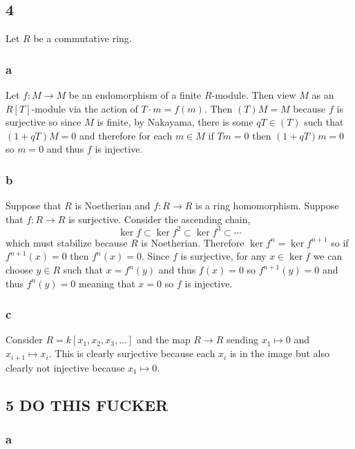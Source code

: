 \documentclass[12pt]{article}
\begin{document}
\subsection{4}

Let $R$ be a commutative ring.

\subsubsection{a}

Let $f : M \to M$ be an endomorphism of a finite $R$-module. Then view $M$ as an $R[T]$-module via the action of $T \cdot m = f(m)$. Then $(T) M = M$ because $f$ is surjective so since $M$ is finite, by Nakayama, there is some $q T \in (T)$ such that $(1 + q T)M = 0$ and therefore for each $m \in M$ if $T m = 0$ then $(1 + q T)m = 0$ so $m = 0$ and thus $f$ is injective.

\subsubsection{b}

Suppose that $R$ is Noetherian and $f : R \to R$ is a ring homomorphism. Suppose that $f : R \to R$ is surjective. Consider the ascending chain,
\[ \ker{f} \subset \ker{f^2} \subset \ker{f^3} \subset \cdots \]
which must stabilize because $R$ is Noetherian. Therefore $\ker{f^n} = \ker{f^{n+1}}$ so if $f^{n+1}(x) = 0$ then $f^n(x) = 0$. Since $f$ is surjective, for any $x \in \ker{f}$ we can choose $y \in R$ such that $x = f^n(y)$ and thus $f(x) = 0$ so $f^{n+1}(y) = 0$ and thus $f^n(y) = 0$ meaning that $x = 0$ so $f$ is injective.

\subsubsection{c}

Consider $R = k[x_1, x_2, x_3, \dots]$ and the map $R \to R$ sending $x_1 \mapsto 0$ and $x_{i+1} \mapsto x_i$. This is clearly surjective because each $x_i$ is in the image but also clearly not injective because $x_1 \mapsto 0$.

\subsection{5 DO THIS FUCKER}

\subsubsection{a}
\end{document}
